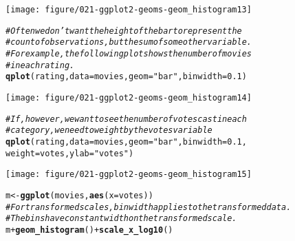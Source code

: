 \documentclass[a4paper,titlepage]{tufte-handout}\usepackage[]{graphicx}\usepackage[]{color}
\makeatletter
\def\maxwidth{ %
  \ifdim\Gin@nat@width>\linewidth
    \linewidth
  \else
    \Gin@nat@width
  \fi
}
\newcommand{\hlnum}[1]{\textcolor[rgb]{0.686,0.059,0.569}{#1}}%
\newcommand{\hlstr}[1]{\textcolor[rgb]{0.192,0.494,0.8}{#1}}%
\newcommand{\hlcom}[1]{\textcolor[rgb]{0.678,0.584,0.686}{\textit{#1}}}%
\newcommand{\hlopt}[1]{\textcolor[rgb]{0,0,0}{#1}}%
\newcommand{\hlstd}[1]{\textcolor[rgb]{0.345,0.345,0.345}{#1}}%
\newcommand{\hlkwb}[1]{\textcolor[rgb]{0.69,0.353,0.396}{#1}}%
\newcommand{\hlkwc}[1]{\textcolor[rgb]{0.333,0.667,0.333}{#1}}%
\newcommand{\hlkwd}[1]{\textcolor[rgb]{0.737,0.353,0.396}{\textbf{#1}}}%
\newenvironment{kframe}{%
 \def\at@end@of@kframe{}%
 \ifinner\ifhmode%
  \def\at@end@of@kframe{\end{minipage}}%
  \begin{minipage}{\columnwidth}%
 \fi\fi%
 \def\FrameCommand##1{\hskip\@totalleftmargin \hskip-\fboxsep
 \colorbox{shadecolor}{##1}\hskip-\fboxsep
     \hskip-\linewidth \hskip-\@totalleftmargin \hskip\columnwidth}%
 \MakeFramed {\advance\hsize-\width
   \@totalleftmargin\z@ \linewidth\hsize
   \@setminipage}}%
 {\par\unskip\endMakeFramed%
 \at@end@of@kframe}
\newenvironment{knitrout}{}{} %
\makeatother
\begin{document}
\begin{knitrout}
\begin{kframe}
{\ttfamily\noindent\itshape\color{messagecolor}{\#\# stat\_bin: binwidth defaulted to range/30. Use 'binwidth = x' to adjust this.}}

{\ttfamily\noindent\color{warningcolor}{\#\# Warning: position\_stack requires constant width: output may be incorrect}}\end{kframe}
\texttt{[image: figure/021-ggplot2-geoms-geom\_histogram13]} 
\begin{kframe}\begin{alltt}
\hlcom{# Often we don't want the height of the bar to represent the}
\hlcom{# count of observations, but the sum of some other variable.}
\hlcom{# For example, the following plot shows the number of movies}
\hlcom{# in each rating.}
\hlkwd{qplot}\hlstd{(rating,} \hlkwc{data}\hlstd{=movies,} \hlkwc{geom}\hlstd{=}\hlstr{"bar"}\hlstd{,} \hlkwc{binwidth} \hlstd{=} \hlnum{0.1}\hlstd{)}
\end{alltt}


{\ttfamily\noindent\color{warningcolor}{\#\# Warning: position\_stack requires constant width: output may be incorrect}}\end{kframe}
\texttt{[image: figure/021-ggplot2-geoms-geom\_histogram14]} 
\begin{kframe}\begin{alltt}
\hlcom{# If, however, we want to see the number of votes cast in each}
\hlcom{# category, we need to weight by the votes variable}
\hlkwd{qplot}\hlstd{(rating,} \hlkwc{data}\hlstd{=movies,} \hlkwc{geom}\hlstd{=}\hlstr{"bar"}\hlstd{,} \hlkwc{binwidth} \hlstd{=} \hlnum{0.1}\hlstd{,}
  \hlkwc{weight}\hlstd{=votes,} \hlkwc{ylab} \hlstd{=} \hlstr{"votes"}\hlstd{)}
\end{alltt}


{\ttfamily\noindent\color{warningcolor}{\#\# Warning: position\_stack requires constant width: output may be incorrect}}\end{kframe}
\texttt{[image: figure/021-ggplot2-geoms-geom\_histogram15]} 
\begin{kframe}\begin{alltt}
\hlstd{m} \hlkwb{<-} \hlkwd{ggplot}\hlstd{(movies,} \hlkwd{aes}\hlstd{(}\hlkwc{x} \hlstd{= votes))}
\hlcom{# For transformed scales, binwidth applies to the transformed data.}
\hlcom{# The bins have constant width on the transformed scale.}
\hlstd{m} \hlopt{+} \hlkwd{geom_histogram}\hlstd{()} \hlopt{+} \hlkwd{scale_x_log10}\hlstd{()}
\end{alltt}



\end{kframe}
\end{knitrout}
\end{document}
